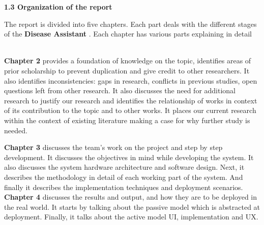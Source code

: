 \documentclass[12pt]{article}
\begin{document}
\vspace{\baselineskip}
\setlength{\parskip}{0.0pt}
\setlength{\parskip}{9.96pt}
\setlength{\parskip}{0.0pt}
\vspace{\baselineskip}
\vspace{\baselineskip}
\vspace{\baselineskip}
\vspace{\baselineskip}
\vspace{\baselineskip}
\vspace{\baselineskip}
\vspace{\baselineskip}
\vspace{\baselineskip}
\vspace{\baselineskip}
\vspace{\baselineskip}
\vspace{\baselineskip}
\vspace{\baselineskip}
\vspace{\baselineskip}
\vspace{\baselineskip}
\vspace{\baselineskip}

\begin{justify}
{\fontsize{14pt}{16.8pt}\selectfont \textbf{1.3 Organization of the report}}
\end{justify}

\vspace{\baselineskip}
\setlength{\parskip}{9.96pt}
\begin{FlushLeft}
The report is divided into five chapters. Each part deals with the different stages of the \textbf{Disease Assistant }. Each chapter has various parts explaining in detail
\end{FlushLeft}
\begin{FlushLeft}
\textbf{\\
\tab Chapter 2} provides a foundation of knowledge on the topic, identifies areas of prior scholarship to prevent duplication and give credit to other researchers. It also identifies inconsistencies: gaps in research, conflicts in previous studies, open questions left from other research. It also discusses the need for additional research to justify our research and identifies the relationship of works in context of its contribution to the topic and to other works. It places our current research within the context of existing literature making a case for why further study is needed.
\end{FlushLeft}
\setlength{\parskip}{12.0pt}
\textbf{Chapter 3 }discusses the team’s work on the project and step by step development. It discusses the objectives in mind while developing the system. It also discusses the system hardware architecture and software design.\textbf{ }Next, it describes the methodology in detail of each working part of the system. And finally it describes the implementation techniques and deployment scenarios.
\textbf{Chapter 4 }discusses the results and output, and how they are to be deployed in the real world.\textbf{ }It starts by talking about the passive model which is abstracted at deployment. Finally, it talks about the active model UI, implementation and UX.
\end{document}
